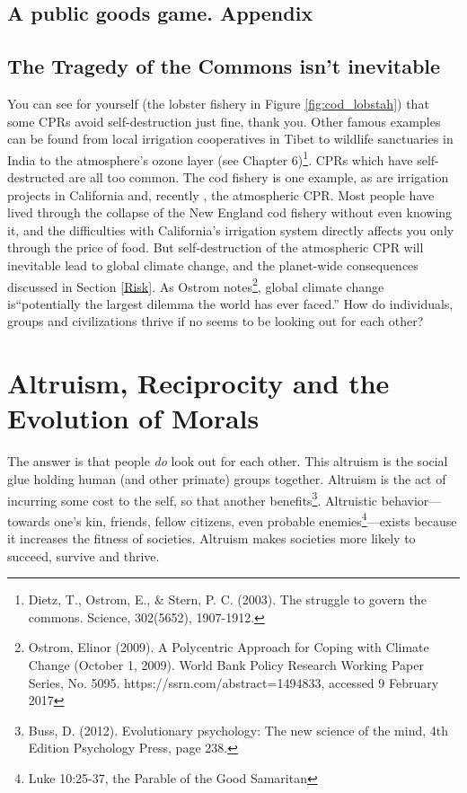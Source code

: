 \subsection{A public goods game. Appendix}
\subsection{The Tragedy of the Commons isn't inevitable}
You can see for yourself (the lobster fishery in Figure \ref{fig:cod_lobstah}) that some CPRs avoid self-destruction just fine, thank you. Other famous examples can be found from local irrigation cooperatives in Tibet to wildlife sanctuaries in India to the atmosphere's ozone layer (see Chapter 6)\footnote{Dietz, T., Ostrom, E., \& Stern, P. C. (2003). The struggle to govern the commons. Science, 302(5652), 1907-1912.}. CPRs which have self-destructed are all too common. The cod fishery is one example, as are irrigation projects in California and, recently , the atmospheric CPR. Most people have lived through the collapse of the New England cod fishery without even knowing it, and the difficulties with California's irrigation system directly affects you only through the price of food. But self-destruction of the atmospheric CPR will inevitable lead to global climate change, and the planet-wide consequences discussed in Section \ref{Risk}. As Ostrom notes\footnote{Ostrom, Elinor (2009). A Polycentric Approach for Coping with Climate Change (October 1, 2009). World Bank Policy Research Working Paper Series, No. 5095. https://ssrn.com/abstract=1494833, accessed 9 February 2017}, global climate change is``potentially the largest dilemma the world has ever faced.'' How do individuals, groups and civilizations thrive if no seems to be looking out for each other?\\ 

\section{Altruism, Reciprocity and the Evolution of Morals} \label{The Evolution of Morals}
The answer is that people \emph{do} look out for each other. This altruism is the social glue holding human (and other primate) groups together. Altruism is the act of incurring some cost to the self, so that another benefits\footnote{Buss, D. (2012). Evolutionary psychology: The new science of the mind, 4th Edition Psychology Press, page 238.}. Altruistic behavior---towards one's kin, friends, fellow citizens, even probable enemies\footnote{Luke 10:25-37, the Parable of the Good Samaritan}---exists because it increases the fitness of societies. Altruism makes societies more likely to succeed, survive and thrive. 

